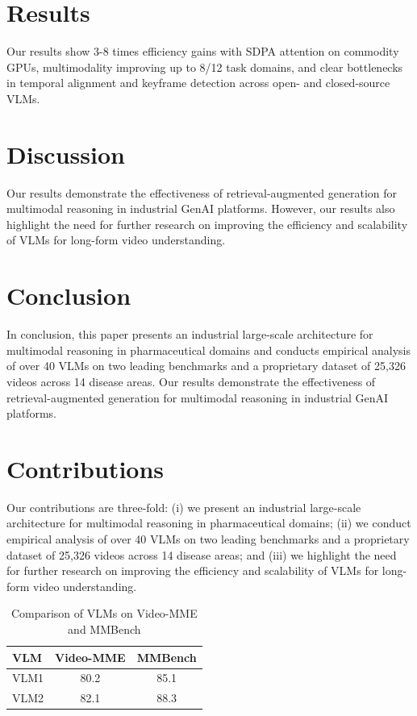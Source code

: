 \documentclass{article}
\begin{document}
        \section{Results}
        Our results show 3-8 times efficiency gains with SDPA attention on commodity GPUs, multimodality improving up to 8/12 task domains, and clear bottlenecks in temporal alignment and keyframe detection across open- and closed-source VLMs.

        \section{Discussion}
        Our results demonstrate the effectiveness of retrieval-augmented generation for multimodal reasoning in industrial GenAI platforms. However, our results also highlight the need for further research on improving the efficiency and scalability of VLMs for long-form video understanding.

        \section{Conclusion}
        In conclusion, this paper presents an industrial large-scale architecture for multimodal reasoning in pharmaceutical domains and conducts empirical analysis of over 40 VLMs on two leading benchmarks and a proprietary dataset of 25,326 videos across 14 disease areas. Our results demonstrate the effectiveness of retrieval-augmented generation for multimodal reasoning in industrial GenAI platforms.

        \section{Contributions}
        Our contributions are three-fold: (i) we present an industrial large-scale architecture for multimodal reasoning in pharmaceutical domains; (ii) we conduct empirical analysis of over 40 VLMs on two leading benchmarks and a proprietary dataset of 25,326 videos across 14 disease areas; and (iii) we highlight the need for further research on improving the efficiency and scalability of VLMs for long-form video understanding.

        \begin{table}[h]
        \centering
        \begin{tabular}{|l|c|c|}
        \hline
        \textbf{VLM} & \textbf{Video-MME} & \textbf{MMBench} \\
        \hline
        VLM1 & 80.2 & 85.1 \\
        VLM2 & 82.1 & 88.3 \\
        \hline
        \end{tabular}
        \caption{Comparison of VLMs on Video-MME and MMBench}
        \label{tab:vlm-comparison}
        \end{table}
\end{document}
